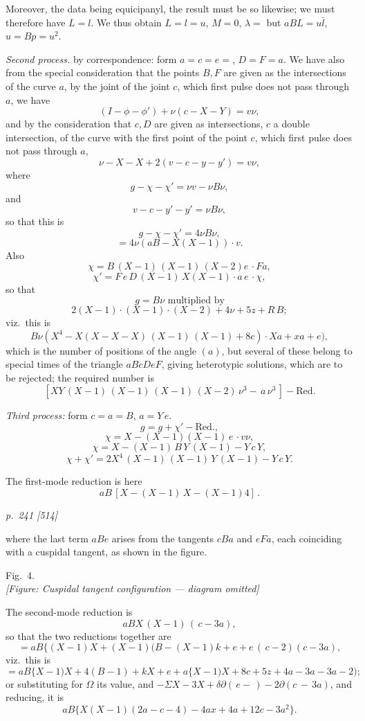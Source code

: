\documentclass[11pt,a4paper]{book}
\begin{document}
Moreover, the data being equicipanyl, the result must be so likewise; we must
therefore have $L=l$.  We thus obtain $L=l=u$, $M=0$, $\lambda=$ but $aBL=u\bar{l}$, $u=Bp=u^2$.

\textit{Second process.}  by correspondence:  form $a=c=e=$, $D=F=a$.  We have
also from the special consideration that the points $B, F$ are given as the intersections
of the curve $a$, by the joint of the joint $c$, which first pulse does not pass
through $a$, we have
\[
(I-\phi-\phi')+\nu (c-X-Y)=v\nu,
\]
and by the consideration that $c, D$ are given as intersections, $c$ a double intersection,
of the curve with the first point of the point $c$, which first pulse does not pass
through $a$,
\[
\nu-X-X+2(v-c-y-y')=v\nu,
\]
where
\[
g-\chi-\chi'=\nu v-\nu B \nu,
\]
and
\[
v-c-y'-y'=\nu B\nu,
\]
so that this is
\[
g-\chi-\chi'=4\nu B\nu,
\]
\[
=4\nu (aB-X(X-1))\cdot v.
\]
Also
\[
\chi=B\,(X-1)\,(X-1)\,(X-2)e\,\cdot Fa,
\]
\[
\chi'=F\,e\,D\,(X-1)\,X(X-1)\cdot a\,e\,\cdot \chi,
\]
so that
\[
g=B\nu \text{ multiplied by}
\]
\[
2(X-1)\cdot (X-1)\cdot (X-2)+4\nu+5z+R\,B;
\]
viz.\ this is
\[
B\nu (X^4-X(X-X-X)\,(X-1)\,(X-1)+8c)\cdot Xa+xa+e),
\]
which is the number of positions of the angle $(a)$, but several of these belong to
special times of the triangle $aBcDeF$, giving heterotypic solutions, which are to be
rejected; the required number is
\[
[XY\,(X-1)\,(X-1)\,(X-1)\,(X-2)\,\nu^3-\,a\,\nu^3\,]-\text{Red.}
\]

\bigskip
\textit{Third process:}  form $c=a=B$, $a=Y\,e$.
\[
g=g+\chi'-\text{Red.},
\]
\[
\chi=X-(X-1)(X-1)\,e\,\cdot v\nu,
\]
\[
\chi=X-(X-1)\,B\,Y\,(X-1)-Y\,c\,Y,
\]
\[
\chi+\chi'=2X^4\,(X-1)\,(X-1)\,Y\,(X-1)-Y\,c\,Y.
\]

The first-mode reduction is here
\[
aB\,[X-(X-1)\,X-(X-1)4]\,.
\]

\clearpage

\bigskip
\textit{p.~241 [514]}
\smallskip

where the last term $aBe$ arises from the tangents $cBa$ and $eFa$, each coinciding with
a cuspidal tangent, as shown in the figure.

\begin{center}
Fig.\ 4.\\
\textit{[Figure: Cuspidal tangent configuration --- diagram omitted]}
\end{center}

The second-mode reduction is
\[
aBX\,(X-1)\,(\,c-3a),
\]
so that the two reductions together are
\[
=aB\{(X-1)X+(X-1)(B-(X-1)k+e+e\,(\,c-2)(c-3a),
\]
viz.\ this is
\[
=aB\{X-1)X+4(B-1)+kX+e+a\{X-1)X+8c+5z+4a-3a-3a-2);
\]
or substituting for $\Omega$ its value, and $-\Sigma X-3X+\delta\partial(\,e-\,)-2\partial(c\,-\,3a)$, and
reducing, it is
\[
aB\{X(X-1)(2a-c-4)-4ax+4a+12c-3a^2\}.
\]
\end{document}
